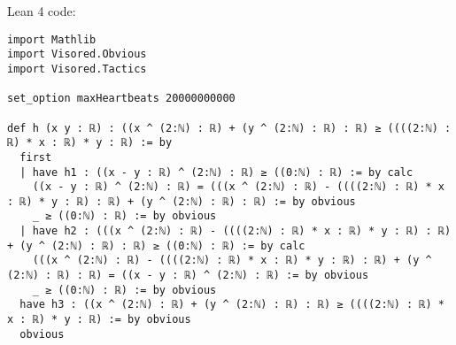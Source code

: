 \documentclass{article}
\begin{document}
Lean 4 code:
\begin{tcolorbox}[colback=white!10, width=\linewidth]
\begin{lstlisting}[language=Lean4]
import Mathlib
import Visored.Obvious
import Visored.Tactics

set_option maxHeartbeats 20000000000

def h (x y : ℝ) : ((x ^ (2:ℕ) : ℝ) + (y ^ (2:ℕ) : ℝ) : ℝ) ≥ ((((2:ℕ) : ℝ) * x : ℝ) * y : ℝ) := by
  first
  | have h1 : ((x - y : ℝ) ^ (2:ℕ) : ℝ) ≥ ((0:ℕ) : ℝ) := by calc
    ((x - y : ℝ) ^ (2:ℕ) : ℝ) = (((x ^ (2:ℕ) : ℝ) - ((((2:ℕ) : ℝ) * x : ℝ) * y : ℝ) : ℝ) + (y ^ (2:ℕ) : ℝ) : ℝ) := by obvious
    _ ≥ ((0:ℕ) : ℝ) := by obvious
  | have h2 : (((x ^ (2:ℕ) : ℝ) - ((((2:ℕ) : ℝ) * x : ℝ) * y : ℝ) : ℝ) + (y ^ (2:ℕ) : ℝ) : ℝ) ≥ ((0:ℕ) : ℝ) := by calc
    (((x ^ (2:ℕ) : ℝ) - ((((2:ℕ) : ℝ) * x : ℝ) * y : ℝ) : ℝ) + (y ^ (2:ℕ) : ℝ) : ℝ) = ((x - y : ℝ) ^ (2:ℕ) : ℝ) := by obvious
    _ ≥ ((0:ℕ) : ℝ) := by obvious
  have h3 : ((x ^ (2:ℕ) : ℝ) + (y ^ (2:ℕ) : ℝ) : ℝ) ≥ ((((2:ℕ) : ℝ) * x : ℝ) * y : ℝ) := by obvious
  obvious

\end{lstlisting}
\end{tcolorbox}
\end{document}
